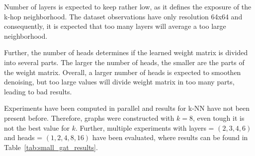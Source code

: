 Number of layers is expected to keep rather low, as it defines the exposure of the k-hop neighborhood.
The dataset observations have only resolution 64x64 and consequently, it is expected that too many layers will 
average a too large neighborhood.

Further, the number of heads determines if the learned weight matrix is divided into several parts.
The larger the number of heads, the smaller are the parts of the weight matrix.
Overall, a larger number of heads is expected to smoothen denoising, but too large values
will divide weight matrix in too many parts, leading to bad results.

Experiments have been computed in parallel and results for k-NN have not been present before. 
Therefore, graphs were constructed with $k=8$, even tough it is not the best value for $k$.
Further, multiple experiments with layers = $(2,3,4,6)$ and heads = $(1,2,4,8,16)$ have been evaluated, 
where results can be found in Table~\ref{tab:small_gat_results}.

\begin{table}[H]
  \centering
  \caption{Small Scale Experiment: Different GAT parameters.}
  \label{tab:small_gat_results}
\end{table}


